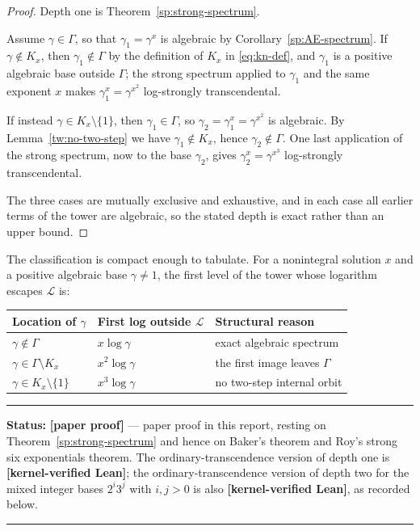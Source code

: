 \documentclass[11pt,oneside]{article}
\theoremstyle{definition}
\theoremstyle{remark}
\newcommand{\LL}{\mathcal L}
\newcommand{\GammaSat}{\Gamma}
\newcommand{\statuslean}{\textcolor{leanblue}{\textbf{[kernel-verified Lean]}}}
\newcommand{\statusnew}{\textcolor{newgreen}{\textbf{[paper proof]}}}
\newenvironment{statusbox}[1]
{\begin{center}\begin{minipage}{0.94\textwidth}\raggedright\hbadness=10000\hrule
\vspace{0.45em}\textbf{Status:} #1\par\vspace{0.35em}}
{\vspace{0.35em}\hrule\end{minipage}\end{center}}
\begin{document}
\begin{proof}
Depth one is Theorem~\ref{sp:strong-spectrum}.

Assume $\gamma\in\GammaSat$, so that $\gamma_1=\gamma^x$ is algebraic by
Corollary~\ref{sp:AE-spectrum}.  If $\gamma\notin K_x$, then
$\gamma_1\notin\GammaSat$ by the definition of $K_x$ in \eqref{eq:kn-def}, and $\gamma_1$
is a positive algebraic base outside $\GammaSat$; the
strong spectrum applied to $\gamma_1$ and the same exponent $x$ makes
$\gamma_1^x=\gamma^{x^2}$ log-strongly transcendental.

If instead $\gamma\in K_x\setminus\{1\}$, then $\gamma_1\in\GammaSat$, so
$\gamma_2=\gamma_1^x=\gamma^{x^2}$ is algebraic.  By Lemma~\ref{tw:no-two-step} we have
$\gamma_1\notin K_x$, hence $\gamma_2\notin\GammaSat$.  One last application of the strong
spectrum, now to the base $\gamma_2$, gives $\gamma_2^x=\gamma^{x^3}$ log-strongly
transcendental.

The three cases are mutually exclusive and exhaustive, and in each case all earlier terms of
the tower are algebraic, so the stated depth is exact rather than an upper bound.
\end{proof}

The classification is compact enough to tabulate.  For a nonintegral solution $x$ and a
positive algebraic base $\gamma\ne1$, the first level of the tower whose logarithm escapes
$\LL$ is:

\begin{center}
\begin{tabular}{@{}p{}p{}p{}@{}}
\toprule
Location of $\gamma$ & First log outside $\LL$ & Structural reason\\
\midrule
$\gamma\notin\GammaSat$ & $x\log\gamma$ & exact algebraic spectrum\\
$\gamma\in\GammaSat\setminus K_x$ & $x^2\log\gamma$ & the first image leaves $\GammaSat$\\
$\gamma\in K_x\setminus\{1\}$ & $x^3\log\gamma$ & no two-step internal orbit\\
\bottomrule
\end{tabular}
\end{center}

\begin{statusbox}{\statusnew{} --- paper proof in this report, resting on
Theorem~\ref{sp:strong-spectrum} and hence on Baker's theorem and Roy's strong six
exponentials theorem.  The ordinary-transcendence version of depth one is \statuslean{}; the
ordinary-transcendence version of depth two for the mixed integer bases $2^i3^j$ with
$i,j>0$ is also \statuslean{}, as recorded below.}
\end{statusbox}
\end{document}
